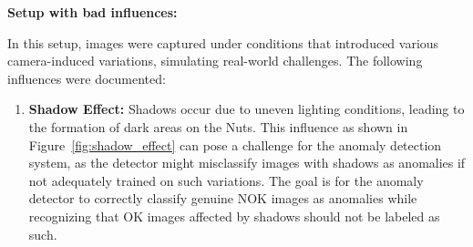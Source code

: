 \documentclass[12pt,DIV14,BCOR12mm,a4paper,footinclude=false,headinclude,parskip=half-,twoside,openright,cleardoublepage=empty,toc=index,bibliography=totoc,listof=totoc]{scrreprt}
\numberwithin{equation}{chapter}
\begin{document}
\textbf{Setup with bad influences:}

In this setup, images were captured under conditions that introduced various camera-induced variations, simulating real-world challenges. The following influences were documented:

\begin{enumerate}
	\item \textbf{Shadow Effect:} Shadows occur due to uneven lighting conditions, leading to the formation of dark areas on the Nuts. This influence as shown in Figure~\ref{fig:shadow_effect} can pose a challenge for the anomaly detection system, as the detector might misclassify images with shadows as anomalies if not adequately trained on such variations. The goal is for the anomaly detector to correctly classify genuine NOK images as anomalies while recognizing that OK images affected by shadows should not be labeled as such.


\end{enumerate}
\end{document}
